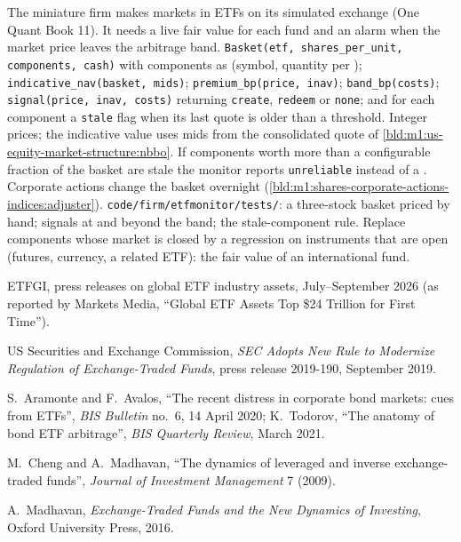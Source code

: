 \begin{build}
 The miniature firm makes markets in ETFs on its simulated
exchange (One Quant Book 11). It needs a live fair value for each fund and an
alarm when the market price leaves the arbitrage band.
 \texttt{Basket(etf, shares\_per\_unit, components, cash)}
with components as (symbol, quantity per );
\texttt{indicative\_nav(basket, mids)}; \texttt{premium\_bp(price, inav)};
\texttt{band\_bp(costs)}; \texttt{signal(price, inav, costs)} returning
\texttt{create}, \texttt{redeem} or \texttt{none}; and for each component a
\texttt{stale} flag when its last quote is older than a threshold.
 Integer prices; the indicative value uses mids from the
consolidated quote of \cref{bld:m1:us-equity-market-structure:nbbo}. If
components worth more than a configurable fraction of the basket are stale
the monitor reports \texttt{unreliable} instead of a . Corporate
actions change the basket overnight
(\cref{bld:m1:shares-corporate-actions-indices:adjuster}).
 \texttt{code/firm/etfmonitor/tests/}: a three-stock
basket priced by hand; signals at and beyond the band; the stale-component
rule.
 Replace components whose market is closed by a regression on
instruments that are open (futures, currency, a related ETF): the fair value
of an international fund.
\end{build}

\begin{omsources}
\item ETFGI, press releases on global ETF industry assets, July--September
2026 (as reported by Markets Media, ``Global ETF Assets Top \$24 Trillion for
First Time'').
\item US Securities and Exchange Commission, \emph{SEC Adopts New Rule to
Modernize Regulation of Exchange-Traded Funds}, press release 2019-190, September 2019.
\item S.~Aramonte and F.~Avalos, ``The recent distress in corporate bond
markets: cues from ETFs'', \emph{BIS Bulletin} no.~6, 14 April 2020; K.~Todorov,
``The anatomy of bond ETF arbitrage'', \emph{BIS Quarterly Review}, March
2021.
\item M.~Cheng and A.~Madhavan, ``The dynamics of leveraged and inverse
exchange-traded funds'', \emph{Journal of Investment Management} 7 (2009).
\item A.~Madhavan, \emph{Exchange-Traded Funds and the New Dynamics of
Investing}, Oxford University Press, 2016.
\end{omsources}


